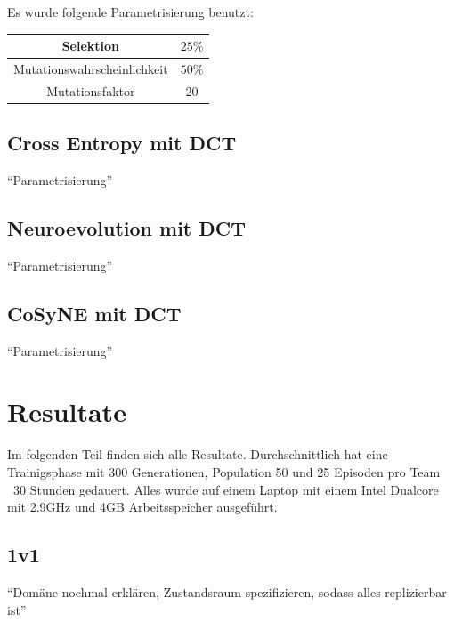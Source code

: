                
            Es wurde folgende Parametrisierung benutzt:

            \begin{center}
            \begin{tabular}{ |c|c| } 
                \hline
                Selektion                   & $25\%$   \\ \hline
                Mutationswahrscheinlichkeit & $50\%$   \\ \hline
                Mutationsfaktor             & $20$     \\ \hline
            \end{tabular}
            \end{center}


        \subsection{Cross Entropy mit DCT}
            ``Parametrisierung''
        \subsection{Neuroevolution mit DCT}
            ``Parametrisierung''
        \subsection{CoSyNE mit DCT}
            ``Parametrisierung''

    \section{Resultate}
        Im folgenden Teil finden sich alle Resultate. Durchschnittlich hat eine Trainigsphase mit 300 Generationen, Population 50 und 25 Episoden pro Team ~30 Stunden gedauert. Alles wurde auf einem Laptop mit einem Intel Dualcore mit 2.9GHz und 4GB Arbeitsspeicher ausgeführt.
        \subsection{1v1}
            ``Domäne nochmal erklären, Zustandsraum spezifizieren, sodass alles replizierbar ist''
